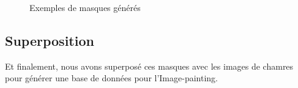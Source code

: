 \begin{figure}[!h]
    \centering
    \qquad
    \caption{Exemples de masques générés}%
    \label{fig:example}%
\end{figure}

\subsection{Superposition}
Et finalement, nous avons superposé ces masques avec les images de chamres pour générer une base de données pour l'Image-painting.


